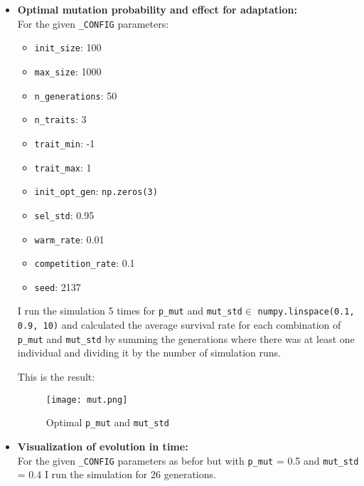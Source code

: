 \documentclass{article}
\begin{document}
\begin{itemize}
    \item \textbf{Optimal mutation probability and effect for adaptation:} \\
    For the given \verb|_CONFIG| parameters:
        \begin{itemize}
            \item \texttt{init\_size}: 100
            \item \texttt{max\_size}: 1000
            \item \texttt{n\_generations}: 50
            \item \texttt{n\_traits}: 3
            \item \texttt{trait\_min}: -1
            \item \texttt{trait\_max}: 1
            \item \texttt{init\_opt\_gen}: \texttt{np.zeros(3)}
            \item \texttt{sel\_std}: 0.95
            \item \texttt{warm\_rate}: 0.01
            \item \texttt{competition\_rate}: 0.1
            \item \texttt{seed}: 2137
        \end{itemize}

    I run the simulation 5 times for \verb|p_mut| and \verb|mut_std|$\in$ \verb|numpy.linspace(0.1, 0.9, 10)|
    and calculated the average survival rate for each combination of \verb|p_mut| and \verb|mut_std| by summing
    the generations where there was at least one individual and dividing it by the number of simulation runs.
    
    
    {\centering
    This is the result:
    \par}

    \begin{figure}[h] %
        \centering %
        \texttt{[image: mut.png]} %
        \caption{Optimal \texttt{p\_mut} and \texttt{mut\_std}} %
        \label{fig:mut} %
    \end{figure}

    \newpage

    \item \textbf{Visualization of evolution in time:} \\
    For the given \verb|_CONFIG| parameters as befor but with \verb|p_mut| = 0.5 and \verb|mut_std| = 0.4
    I run the simulation for 26 generations.
    

\end{itemize}
\end{document}
